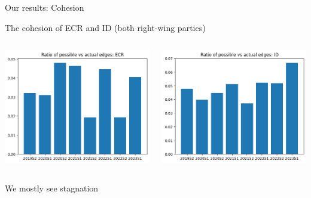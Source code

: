 \documentclass{beamer}
\begin{document}
\begin{frame}{Our results: Cohesion}
	
	The cohesion of ECR and ID (both right-wing parties)
	
	\pause
	
	\vspace{0.5cm}
	
	\begin{columns}
		
		\begin{column}{0.4\textwidth}
			\includegraphics[width=\textwidth]{img/coh_ecr.png}
		\end{column}
		
		\begin{column}{0.4\textwidth}
			\includegraphics[width=\textwidth]{img/coh_id.png}
		\end{column}
		
	\end{columns}
	
	\vspace{0.5cm}
	
	\pause We mostly see stagnation
\end{frame}
\end{document}
